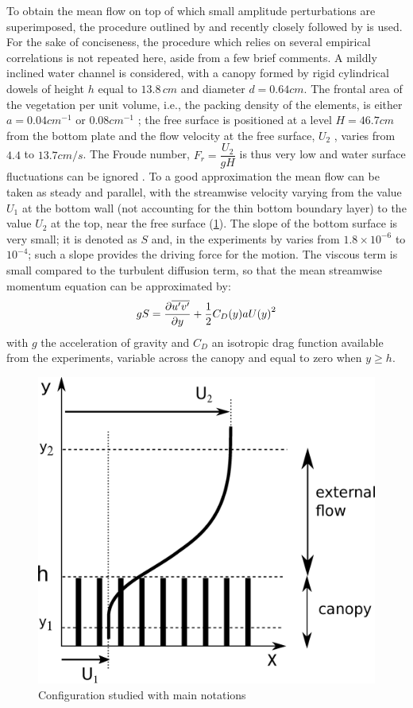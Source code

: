 To obtain the mean flow on top of which small amplitude perturbations are superimposed, the
procedure outlined by \citet{ghisalberti2004limited} and recently closely followed by \citet{zampogna2016instability} is
used. For the sake of conciseness, the procedure which relies on several empirical correlations is
not repeated here, aside from a few brief comments. A mildly inclined water channel is considered, with a canopy formed by rigid cylindrical dowels of height $h$ equal to $13.8 \, cm$ and diameter
$d = 0.64 cm$. The frontal area of the vegetation per unit volume, i.e., the packing density of the
elements, is either $a = 0.04 cm^{-1}$ or  $0.08 cm^{-1}$ ; the free surface is positioned at a level $H = 46.7 cm$
from the bottom plate and the flow velocity at the free surface, $U_2$ , varies from $4.4$ to $13.7 cm/s$. The
Froude number, $F_r = \dfrac{U_2}{g H} $ is thus very low and water surface fluctuations can be ignored \citet{brevis2014experimental}. 
To a good approximation the mean flow can be taken as steady and parallel, with the streamwise
velocity varying from the value $U_1$ at the bottom wall (not accounting for the thin bottom boundary
layer) to the value $U_2$ at the top, near the free surface (\ref{fig:1}). The slope of the bottom surface is
very small; it is denoted as $S$ and, in the experiments by \citet{ghisalberti2004limited} varies from $1.8 \times 10^{-6}$ 
to $10^{-4}$; such a slope provides the driving force for the motion. The viscous term is small compared to
the turbulent diffusion term, so that the mean streamwise momentum equation can be approximated
by:
\begin{equation}
gS = \dfrac{\partial \overline{u'v'}}{\partial y} + \frac{1}{2} C_D(y) a {U(y)}^2 
\label{eq:1}
\end{equation}
with $g$ the acceleration of gravity and $C_D$ an isotropic drag function available from the experiments,
variable across the canopy and equal to zero when $y \geq h$.

\begin{figure}[h]
	\centering
	\includegraphics[width=0.5\linewidth]{chapter_3/figure/1}
	\caption{Configuration studied with main notations}
	\label{fig:1}
\end{figure}


